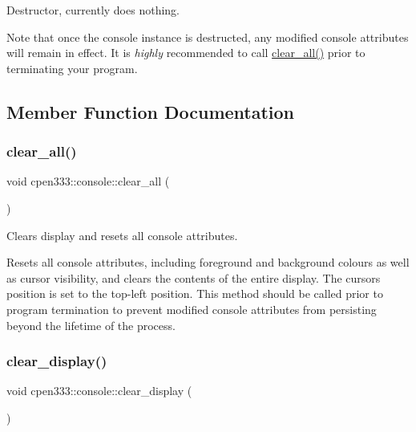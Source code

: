 Destructor, currently does nothing. 

Note that once the console instance is destructed, any modified console attributes will remain in effect. It is {\itshape highly} recommended to call {\ttfamily \hyperlink{classcpen333_1_1console_ad2a40d6f5e9016c5e58592120e3b608d}{clear\+\_\+all()}} prior to terminating your program. 

\subsection{Member Function Documentation}
\mbox{\label{classcpen333_1_1console_ad2a40d6f5e9016c5e58592120e3b608d}} 
\subsubsection{\texorpdfstring{clear\+\_\+all()}{clear\_all()}}
{\footnotesize\ttfamily void cpen333\+::console\+::clear\+\_\+all (\begin{DoxyParamCaption}{ }\end{DoxyParamCaption})\hspace{0.3cm}{\ttfamily [inline]}}



Clears display and resets all console attributes. 

Resets all console attributes, including foreground and background colours as well as cursor visibility, and clears the contents of the entire display. The cursor\textquotesingle{}s position is set to the top-\/left position. This method should be called prior to program termination to prevent modified console attributes from persisting beyond the lifetime of the process. \mbox{\label{classcpen333_1_1console_a9be67402cba00113f607d3ec1c2d0f2c}} 
\subsubsection{\texorpdfstring{clear\+\_\+display()}{clear\_display()}}
{\footnotesize\ttfamily void cpen333\+::console\+::clear\+\_\+display (\begin{DoxyParamCaption}{ }\end{DoxyParamCaption})\hspace{0.3cm}{\ttfamily [inline]}}




